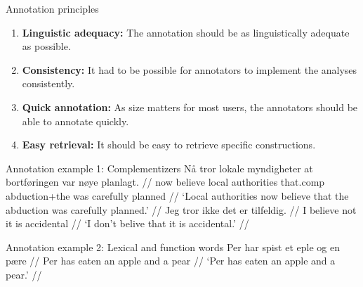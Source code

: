 \documentclass{ltgposter12}
\begin{document}
\begin{columns}[t]
\begin{column}{0.25\textwidth}
        \begin{block}{Annotation principles}
          \begin{enumerate}
           \item \textbf{Linguistic adequacy:} The annotation should be as linguistically adequate as possible.
           \item \textbf{Consistency:} It had to be possible for annotators to implement the analyses consistently.
           \item \textbf{Quick annotation:} As size matters for most users, the annotators should be able to annotate quickly.
           \item \textbf{Easy retrieval:} It should be easy to retrieve specific constructions.
          \end{enumerate}
        \end{block}
        \begin{block}{Annotation example 1: Complementizers}
            \ex\label{medat}\begingl
                \gla Nå tror lokale myndigheter at bortføringen var nøye planlagt. //
                \glb now believe local authorities that.comp abduction+the was carefully planned //
                \glft`Local authorities now believe that the abduction was carefully planned.' //
           \endgl\xe
            \ex\label{utenat}\begingl
                \gla Jeg tror ikke det er tilfeldig. //
                \glb I believe not it is accidental //
                \glft `I don't belive that it is accidental.' //
           \endgl\xe
        \end{block}
        \begin{block}{Annotation example 2: Lexical and function words}
            \ex\label{utenat}\begingl
                \gla Per har spist et eple og en pære //
                \glb Per has eaten an apple and a pear //
                \glft `Per has eaten an apple and a pear.' //
           \endgl\xe
        \end{block}
    \end{column}


\end{columns}
\end{document}
